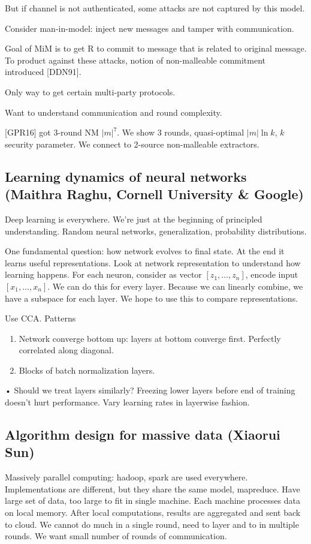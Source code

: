 But if channel is not authenticated, some attacks are not captured by this model.

Consider man-in-model: inject new messages and tamper with communication.

Goal of MiM is to get R to commit to message that is related to original message. To product against these attacks, notion of non-malleable commitment introduced [DDN91].

Only way to get certain multi-party  protocols. 

Want to understand communication and round complexity.

[GPR16] got 3-round NM $|m|^7$. We show 3 rounds, quasi-optimal $|m|\ln k$, $k$ security parameter. We connect to 2-source non-malleable extractors.

\subsection{Learning dynamics of neural networks (Maithra Raghu, Cornell University \& Google)} 

Deep learning is everywhere. We're just at the beginning of principled understanding. Random neural networks, generalization, probability distributions.

One fundamental question: how network evolves to final state. 
At the end it learns useful representations. 
Look at network representation to understand how learning happens. For each neuron, consider as vector $[z_1,\ldots, z_n]$, encode input $[x_1,\ldots, x_n]$. We can do this for every layer. Because we can linearly combine, we have a subspace for each layer. We hope to use this to compare representations.

Use CCA. 
Patterns
\begin{enumerate}
\item
Network converge bottom up: layers at bottom converge first. Perfectly correlated along diagonal.
\item
Blocks of batch normalization layers.
\end{enumerate}•
Should we treat layers similarly? Freezing lower layers before end of training doesn't hurt performance. Vary learning rates in layerwise fashion.

\subsection{Algorithm design for massive data (Xiaorui Sun)}
Massively parallel computing: hadoop, spark are used everywhere. Implementations are different, but they share the same model, mapreduce. Have large set of data, too large to fit in single machine. Each machine processes data on local memory. After local computations, results are aggregated and sent back to cloud. We cannot do much in a single round, need to layer and to in multiple rounds. We want small number of rounds of communication.

